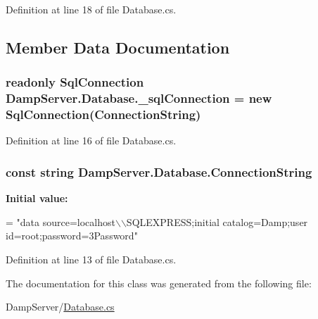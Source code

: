 Definition at line 18 of file Database.\-cs.



\subsection{Member Data Documentation}
\hypertarget{class_damp_server_1_1_database_ad5bbb40fda2c2880cd6fd08c184397f4}{
\subsubsection[{\-\_\-sql\-Connection}]{\setlength{\rightskip}{0pt plus 5cm}readonly Sql\-Connection Damp\-Server.\-Database.\-\_\-sql\-Connection = new Sql\-Connection({\bf Connection\-String})\hspace{0.3cm}{\ttfamily [private]}}}\label{class_damp_server_1_1_database_ad5bbb40fda2c2880cd6fd08c184397f4}


Definition at line 16 of file Database.\-cs.

\hypertarget{class_damp_server_1_1_database_a5231fd2642a827cc446f2b6c1692266a}{
\subsubsection[{Connection\-String}]{\setlength{\rightskip}{0pt plus 5cm}const string Damp\-Server.\-Database.\-Connection\-String\hspace{0.3cm}{\ttfamily [private]}}}\label{class_damp_server_1_1_database_a5231fd2642a827cc446f2b6c1692266a}
{\bfseries Initial value\-:}
\begin{DoxyCode}
=
            \textcolor{stringliteral}{"data source=localhost\(\backslash\)\(\backslash\)SQLEXPRESS;initial catalog=Damp;user id=root;password=3Password"}
\end{DoxyCode}


Definition at line 13 of file Database.\-cs.



The documentation for this class was generated from the following file\-:\begin{DoxyCompactItemize}
\item 
Damp\-Server/\hyperlink{_database_8cs}{Database.\-cs}\end{DoxyCompactItemize}
